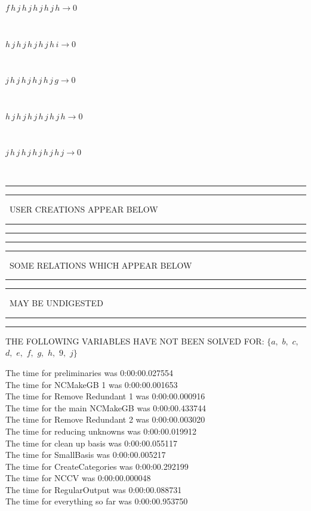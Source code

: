 \documentclass[rep10,leqno]{report}
\begin{document}
\begin{minipage}{6in}
$
f\,
 h\,
 j\,
 h\,
 j\,
 h\,
 j\,
 h\,
 j\,
 h\rightarrow 0
$
\end{minipage}\medskip \\
\begin{minipage}{6in}
$
h\,
 j\,
 h\,
 j\,
 h\,
 j\,
 h\,
 j\,
 h\,
 i\rightarrow 0
$
\end{minipage}\medskip \\
\begin{minipage}{6in}
$
j\,
 h\,
 j\,
 h\,
 j\,
 h\,
 j\,
 h\,
 j\,
 g\rightarrow 0
$
\end{minipage}\medskip \\
\begin{minipage}{6in}
$
h\,
 j\,
 h\,
 j\,
 h\,
 j\,
 h\,
 j\,
 h\,
 j\,
 h\rightarrow 0
$
\end{minipage}\medskip \\
\begin{minipage}{6in}
$
j\,
 h\,
 j\,
 h\,
 j\,
 h\,
 j\,
 h\,
 j\,
 h\,
 j\rightarrow 0
$
\end{minipage}\\
\rule[2pt]{6in}{1pt}\hfil\break
\rule[2.5pt]{1.701in}{1pt}
\ USER CREATIONS APPEAR BELOW\ 
\rule[2.5pt]{1.701in}{1pt}\hfil\break
\rule[2pt]{6in}{1pt}\hfil\break
\rule[2pt]{6in}{4pt}\hfil\break
\rule[2pt]{1.45in}{4pt}
\ SOME RELATIONS WHICH APPEAR BELOW\ 
\rule[2pt]{1.45in}{4pt}\hfil\break
\rule[2pt]{2.18in}{4pt}
\ MAY BE UNDIGESTED\ 
\rule[2pt]{2.18in}{4pt}\hfil\break
\rule[2pt]{6in}{4pt}\hfil\break
THE FOLLOWING VARIABLES HAVE NOT BEEN SOLVED FOR:\hfil\break
$\{a,
$ $
b,
$ $
c,
$ $
d,
$ $
e,
$ $
f,
$ $
g,
$ $
h,
$ $
9,
$ $
j\}$
\smallskip\\
\vspace{10pt}

\noindent
The time for preliminaries was 0:00:00.027554\\
The time for NCMakeGB 1 was 0:00:00.001653\\
The time for Remove Redundant 1 was 0:00:00.000916\\
The time for the main NCMakeGB was 0:00:00.433744\\
The time for Remove Redundant 2 was 0:00:00.003020\\
The time for reducing unknowns was 0:00:00.019912\\
The time for clean up basis was 0:00:00.055117\\
The time for SmallBasis was 0:00:00.005217\\
The time for CreateCategories was 0:00:00.292199\\
The time for NCCV was 0:00:00.000048\\
The time for RegularOutput was 0:00:00.088731\\
The time for everything so far was 0:00:00.953750\\
\end{document}
